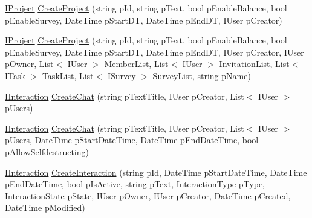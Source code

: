 \begin{DoxyCompactItemize}
\item 
\hyperlink{interface_plex_byte_1_1_mo_cap_1_1_interactions_1_1_i_project}{I\+Project} \hyperlink{interface_plex_byte_1_1_mo_cap_1_1_interactions_1_1_i_interaction_factory_a185e39ef7292fa875c3e60eead0eb1d7}{Create\+Project} (string p\+Id, string p\+Text, bool p\+Enable\+Balance, bool p\+Enable\+Survey, Date\+Time p\+Start\+DT, Date\+Time p\+End\+DT, I\+User p\+Creator)
\item 
\hyperlink{interface_plex_byte_1_1_mo_cap_1_1_interactions_1_1_i_project}{I\+Project} \hyperlink{interface_plex_byte_1_1_mo_cap_1_1_interactions_1_1_i_interaction_factory_a96f9a4cfec44b654fedcc3e62fe617ca}{Create\+Project} (string p\+Id, string p\+Text, bool p\+Enable\+Balance, bool p\+Enable\+Survey, Date\+Time p\+Start\+DT, Date\+Time p\+End\+DT, I\+User p\+Creator, I\+User p\+Owner, List$<$ I\+User $>$ \hyperlink{namespace_plex_byte_1_1_mo_cap_1_1_interactions_aa78ff2ea1c7ea92537cb6b3552b6a7daa3547319d6f4e11ac104fe2012b8c99c4}{Member\+List}, List$<$ I\+User $>$ \hyperlink{namespace_plex_byte_1_1_mo_cap_1_1_interactions_aa78ff2ea1c7ea92537cb6b3552b6a7daa1a7f5ee14da52a7231b80e347f1fe0eb}{Invitation\+List}, List$<$ \hyperlink{interface_plex_byte_1_1_mo_cap_1_1_interactions_1_1_i_task}{I\+Task} $>$ \hyperlink{namespace_plex_byte_1_1_mo_cap_1_1_interactions_aa78ff2ea1c7ea92537cb6b3552b6a7daab3f0f2eb7b25831c4e3f1d6fb7d48130}{Task\+List}, List$<$ \hyperlink{interface_plex_byte_1_1_mo_cap_1_1_interactions_1_1_i_survey}{I\+Survey} $>$ \hyperlink{namespace_plex_byte_1_1_mo_cap_1_1_interactions_aa78ff2ea1c7ea92537cb6b3552b6a7daaf698bdcd42e8985484f12fc4245a4843}{Survey\+List}, string p\+Name)
\item 
\hyperlink{interface_plex_byte_1_1_mo_cap_1_1_interactions_1_1_i_interaction}{I\+Interaction} \hyperlink{interface_plex_byte_1_1_mo_cap_1_1_interactions_1_1_i_interaction_factory_aabee33e1d8b7c8106b543dc52b218782}{Create\+Chat} (string p\+Text\+Title, I\+User p\+Creator, List$<$ I\+User $>$ p\+Users)
\item 
\hyperlink{interface_plex_byte_1_1_mo_cap_1_1_interactions_1_1_i_interaction}{I\+Interaction} \hyperlink{interface_plex_byte_1_1_mo_cap_1_1_interactions_1_1_i_interaction_factory_a41eeaa8cf6c81e669898eb2b4d57eb9b}{Create\+Chat} (string p\+Text\+Title, I\+User p\+Creator, List$<$ I\+User $>$ p\+Users, Date\+Time p\+Start\+Date\+Time, Date\+Time p\+End\+Date\+Time, bool p\+Allow\+Selfdestructing)
\item 
\hyperlink{interface_plex_byte_1_1_mo_cap_1_1_interactions_1_1_i_interaction}{I\+Interaction} \hyperlink{interface_plex_byte_1_1_mo_cap_1_1_interactions_1_1_i_interaction_factory_a7a9e3fc490901c3a0be3faadadb27494}{Create\+Interaction} (string p\+Id, Date\+Time p\+Start\+Date\+Time, Date\+Time p\+End\+Date\+Time, bool p\+Is\+Active, string p\+Text, \hyperlink{namespace_plex_byte_1_1_mo_cap_1_1_interactions_a6e7bea333446664bbce2bb296db25e31}{Interaction\+Type} p\+Type, \hyperlink{namespace_plex_byte_1_1_mo_cap_1_1_interactions_afcb673d9186608b6bd3b187179aedc8a}{Interaction\+State} p\+State, I\+User p\+Owner, I\+User p\+Creator, Date\+Time p\+Created, Date\+Time p\+Modified)
\end{DoxyCompactItemize}


